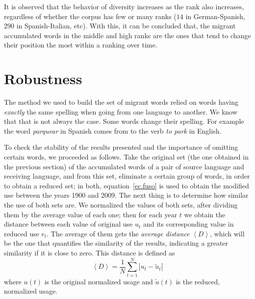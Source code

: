 \documentclass[10pt,letterpaper]{article} %
\begin{document}
It is observed that the behavior of
diversity increases as the rank also increases, regardless of whether the
corpus has few or many ranks ($14$ in German-Spanish, $290$ in Spanish-Italian,
etc). With this, it can be concluded that, the migrant accumulated words in the
middle and high ranks are the ones that tend to change their position the most
within a ranking over time.



\section*{Robustness} %
The method we used to build the set of migrant words relied on words having {\it
exactly} the same spelling when going from one language to another. We know 
that that is not always the case. Some words change their spelling. For example
the word {\it parquear} in Spanish comes from to the verb {\it to park} in
English. 


To check the stability of the results presented and the importance of
omitting certain words, we proceeded as follows. 
Take the original set (the one obtained in the previous section) of the
accumulated words of a pair of source language and
receiving language, and from this set, eliminate a certain group of words, in order
to obtain a reduced set; in both,  equation~\ref{ec.fuso} is used to obtain the
modified
use between the years 1900 and 2009.
The next thing is to determine how similar the use of both sets are. We
normalized the values of both sets, after dividing them by the average value of
each one; then for each year $t$ we obtain the distance between each value of
original use $u_{t}$ and its corresponding value in reduced use $r_{t}$. The
average of them gets the \textit{average distance} $\left\langle D
\right\rangle$, which will be the one that quantifies the similarity of the
results, indicating a greater similarity if it is close to zero. This 
distance is defined as 
\begin{equation}
\left\langle D \right\rangle  = \frac{1}{N}\sum_{t=1}^{N} \left| u_{t} - \tilde u_{t} \right|  
\label{ec.Davg}
\end{equation}
where $u(t)$ is the original normalized usage and $\tilde u(t)$ is the reduced,
normalized usage.
\end{document}
